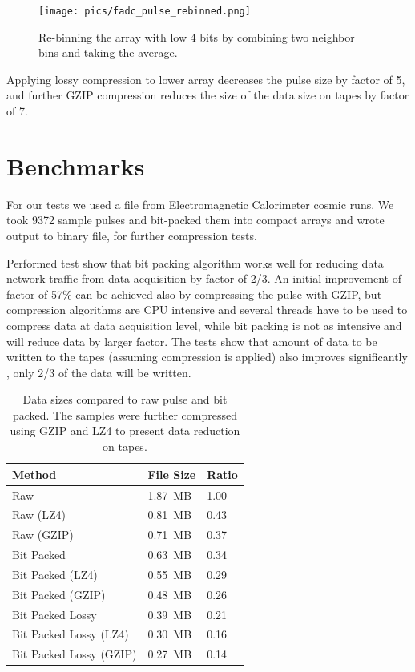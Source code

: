 \documentclass[12pt]{article}
\begin{document}
\begin{figure}[!h]
\begin{center}

 \texttt{[image: pics/fadc\_pulse\_rebinned.png]}

 \caption {Re-binning the array with low 4 bits by combining two neighbor bins and taking the average. }
 \label{FADC_PULSE_BITS_REBINNED}
 \end{center}
\end{figure}

Applying lossy compression to lower array decreases the pulse size by factor of  5, and further
GZIP compression reduces the size of the data size on tapes by factor of  7.

\section{Benchmarks}

For our tests we used a file from Electromagnetic Calorimeter cosmic runs. We took 9372 sample
pulses and bit-packed them into compact arrays and wrote output to binary file, for further 
compression tests.

Performed test show that bit packing algorithm works well for reducing data network traffic 
from data acquisition by factor of 2/3. An initial improvement of factor of 57\% can be achieved 
also by compressing the pulse with GZIP, but compression algorithms are CPU intensive and several
threads have to be used to compress data at data acquisition level, while bit packing is not as intensive
and will reduce data by larger factor. The tests show that amount of data to be written to the tapes 
(assuming compression is applied) also improves significantly , only 2/3 of the data will be written.

\begin{table}[!h]
\begin{center}
\begin{tabular}{  p{10cm} | p{2cm} | p{1.5cm} }
\hline 
Method & File Size & Ratio \\
\hline 
\hline 
Raw & 1.87~MB & 1.00 \\
Raw (LZ4) & 0.81~MB & 0.43 \\
Raw (GZIP) & 0.71~MB & 0.37 \\
\rowcolor{LightCyan}
Bit Packed &  0.63~MB & 0.34 \\
Bit Packed (LZ4) & 0.55~MB & 0.29 \\
\rowcolor{LightRose}
Bit Packed (GZIP) & 0.48~MB & 0.26 \\
Bit Packed Lossy  & 0.39~MB & 0.21 \\
Bit Packed Lossy  (LZ4) & 0.30~MB & 0.16 \\
\rowcolor{LightGreen}
Bit Packed Lossy (GZIP) & 0.27~MB & 0.14 \\
\hline
\end{tabular}
\caption{Data sizes compared to raw pulse and bit packed. The samples were further
compressed using GZIP and LZ4 to present data reduction on tapes.}
\end{center}
\end{table}
\end{document}

